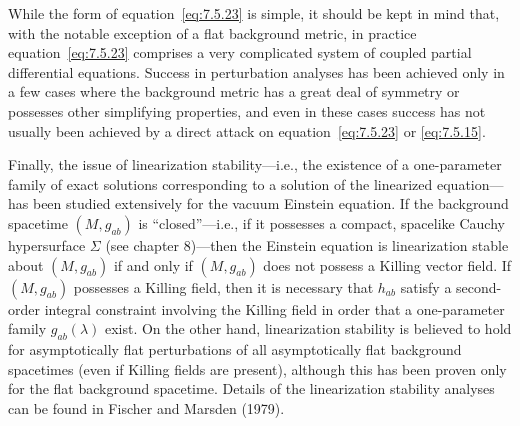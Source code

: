 While the form of equation~\eqref{eq:7.5.23} is simple, it should be kept in mind
that, with the notable exception of a flat background metric, in practice
equation~\eqref{eq:7.5.23} comprises a very complicated system of coupled partial
differential equations. Success in perturbation analyses has been achieved only in a
few cases where the background metric has a great deal of symmetry or possesses
other simplifying properties, and even in these cases success has not usually been
achieved by a direct attack on equation~\eqref{eq:7.5.23} or
\eqref{eq:7.5.15}.

Finally, the issue of linearization stability---i.e., the existence of a one-parameter
family of exact solutions corresponding to a solution of the linearized equation---has
been studied extensively for the vacuum Einstein equation. If the background
spacetime \((M,g_{ab})\) is “closed”---i.e., if it possesses a compact, spacelike
Cauchy hypersurface \(\Sigma\) (see chapter 8)---then the Einstein equation is
linearization stable about \((M,g_{ab})\) if and only if \((M,g_{ab})\) does not
possess a Killing vector field. If \((M,g_{ab})\) possesses a Killing field, then it
is necessary that \(h_{ab}\) satisfy a second-order integral constraint involving the
Killing field in order that a one-parameter family \(g_{ab}(\lambda)\) exist. On the
other hand, linearization stability is believed to hold for asymptotically flat
perturbations of all asymptotically flat background spacetimes (even if Killing fields
are present), although this has been proven only for the flat background spacetime.
Details of the linearization stability analyses can be found in Fischer and Marsden
(1979).
